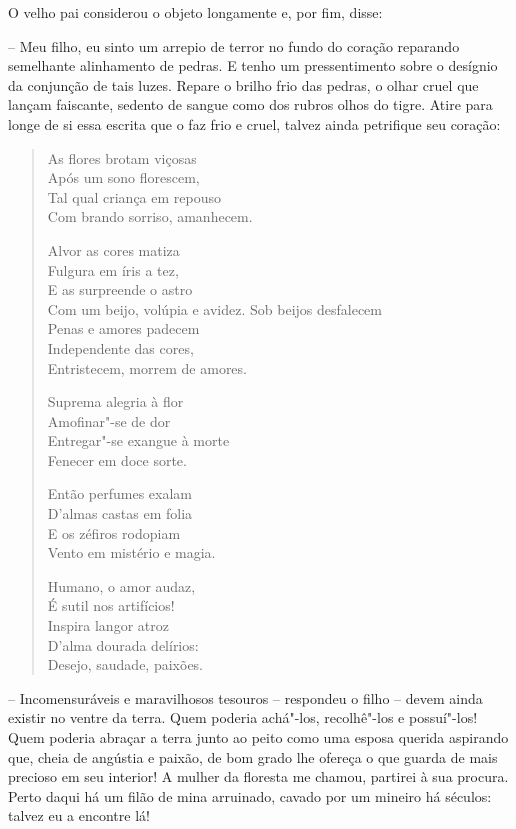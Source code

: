 O velho pai considerou o objeto longamente e, por fim, disse:

-- Meu filho, eu sinto um arrepio de terror no fundo do coração
reparando semelhante alinhamento de pedras. E tenho um pressentimento
sobre o desígnio da conjunção de tais luzes. Repare o brilho frio das
pedras, o olhar cruel que lançam faiscante, sedento de sangue como dos
rubros olhos do tigre. Atire para longe de si essa escrita que o faz
frio e cruel, talvez ainda petrifique seu coração:

\begin{verse}
As flores brotam viçosas\\
Após um sono florescem,\\
Tal qual criança em repouso\\
Com brando sorriso, amanhecem.

Alvor as cores matiza\\
Fulgura em íris a tez,\\
E as surpreende o astro\\
Com um beijo, volúpia e avidez. 
\pagebreak
Sob beijos desfalecem\\
Penas e amores padecem\\
Independente das cores,\\
Entristecem, morrem de amores.

Suprema alegria à flor\\
Amofinar"-se de dor\\
Entregar"-se exangue à morte\\
Fenecer em doce sorte. 

Então perfumes exalam\\
D'almas castas em folia\\
E os zéfiros rodopiam\\
Vento em mistério e magia.

Humano, o amor audaz,\\
É sutil nos artifícios!\\ 
Inspira langor atroz\\
D'alma dourada delírios:\\
Desejo, saudade, paixões.
\end{verse}

-- Incomensuráveis e maravilhosos tesouros -- respondeu o filho -- devem
ainda existir no ventre da terra. Quem poderia achá"-los, recolhê"-los e
possuí"-los! Quem poderia abraçar a terra junto ao peito como uma esposa
querida aspirando que, cheia de angústia e paixão, de bom grado lhe
ofereça o que guarda de mais precioso em seu interior! A mulher da
floresta me chamou, partirei à sua procura. Perto daqui há um filão de
mina arruinado, cavado por um mineiro há séculos: talvez eu a encontre lá!

